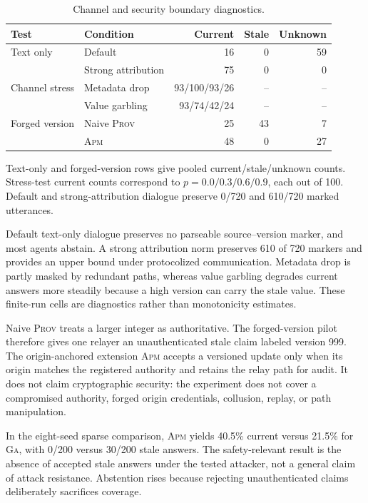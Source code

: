 \documentclass[sigconf,anonymous]{acmart}
\newcommand{\prov}{\textsc{Prov}}
\newcommand{\apm}{\textsc{Apm}}
\newcommand{\ga}{\textsc{Ga}}
\begin{document}
\begin{table}[H]
  \caption{Channel and security boundary diagnostics.}
  \label{tab:app-boundaries}
  \label{tab:app-text}
  \label{tab:app-stress}
  \label{tab:app-attack}
  \centering
  \small
  \begin{tabular}{@{}llrrr@{}}
    \toprule
    Test & Condition & Current & Stale & Unknown \\
    \midrule
    Text only & Default & 16 & 0 & 59 \\
              & Strong attribution & 75 & 0 & 0 \\
    \addlinespace
    Channel stress & Metadata drop & 93/100/93/26 & -- & -- \\
                   & Value garbling & 93/74/42/24 & -- & -- \\
    \addlinespace
    Forged version & Naive \prov{} & 25 & 43 & 7 \\
                   & \apm{} & 48 & 0 & 27 \\
    \bottomrule
  \end{tabular}
  \par\medskip
  \parbox{\columnwidth}{\footnotesize Text-only and forged-version rows give pooled
  current/stale/unknown counts.  Stress-test current counts correspond to
  $p=0.0/0.3/0.6/0.9$, each out of 100.  Default and strong-attribution dialogue preserve
  0/720 and 610/720 marked utterances.}
\end{table}

Default text-only dialogue preserves no parseable source--version marker, and most agents
abstain.  A strong attribution norm preserves 610 of 720 markers and provides an
upper bound under protocolized communication.  Metadata drop is partly masked by redundant
paths, whereas value garbling degrades current answers more steadily because a high version can
carry the stale value.  These finite-run cells are diagnostics rather than monotonicity
estimates.

Naive \prov{} treats a larger integer as authoritative.  The forged-version pilot therefore
gives one relayer an unauthenticated stale claim labeled version 999.  The origin-anchored
extension \apm{} accepts a versioned update only when its origin matches the registered authority
and retains the relay path for audit.  It does not claim cryptographic security: the experiment
does not cover a compromised authority, forged origin credentials, collusion, replay, or path
manipulation.

In the eight-seed sparse comparison, \apm{} yields 40.5\% current versus 21.5\% for \ga{}, with
0/200 versus 30/200 stale answers.  The safety-relevant result is the absence of accepted stale
answers under the tested attacker, not a general claim of attack resistance.  Abstention rises
because rejecting unauthenticated claims deliberately sacrifices coverage.
\end{document}
